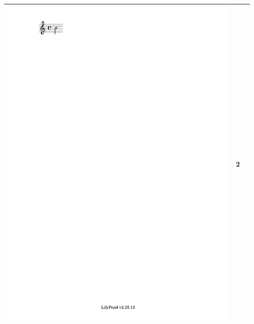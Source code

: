 \documentclass[11pt]{article}
\theoremstyle{definition}
\begin{document}
\begin{table}
\begin{tabular}{|c|c|c|}
\includegraphics[trim=4.29cm 27cm 16cm 1.5cm, clip, scale=1]{half_note.pdf} & 2  \\
\hline

\end{tabular}
\end{table}
\end{document}

